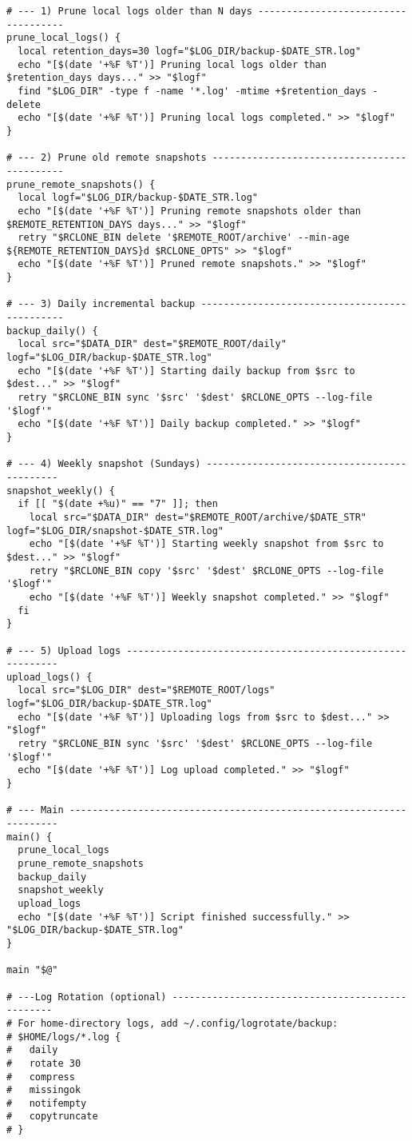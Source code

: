 \documentclass[12pt,letterpaper]{article}
\begin{document}
\begin{lstlisting}[style=custombash]
# --- 1) Prune local logs older than N days ------------------------------------
prune_local_logs() {
  local retention_days=30 logf="$LOG_DIR/backup-$DATE_STR.log"
  echo "[$(date '+%F %T')] Pruning local logs older than $retention_days days..." >> "$logf"
  find "$LOG_DIR" -type f -name '*.log' -mtime +$retention_days -delete
  echo "[$(date '+%F %T')] Pruning local logs completed." >> "$logf"
}

# --- 2) Prune old remote snapshots --------------------------------------------
prune_remote_snapshots() {
  local logf="$LOG_DIR/backup-$DATE_STR.log"
  echo "[$(date '+%F %T')] Pruning remote snapshots older than $REMOTE_RETENTION_DAYS days..." >> "$logf"
  retry "$RCLONE_BIN delete '$REMOTE_ROOT/archive' --min-age ${REMOTE_RETENTION_DAYS}d $RCLONE_OPTS" >> "$logf"
  echo "[$(date '+%F %T')] Pruned remote snapshots." >> "$logf"
}

# --- 3) Daily incremental backup ----------------------------------------------
backup_daily() {
  local src="$DATA_DIR" dest="$REMOTE_ROOT/daily" logf="$LOG_DIR/backup-$DATE_STR.log"
  echo "[$(date '+%F %T')] Starting daily backup from $src to $dest..." >> "$logf"
  retry "$RCLONE_BIN sync '$src' '$dest' $RCLONE_OPTS --log-file '$logf'"
  echo "[$(date '+%F %T')] Daily backup completed." >> "$logf"
}

# --- 4) Weekly snapshot (Sundays) --------------------------------------------
snapshot_weekly() {
  if [[ "$(date +%u)" == "7" ]]; then
    local src="$DATA_DIR" dest="$REMOTE_ROOT/archive/$DATE_STR" logf="$LOG_DIR/snapshot-$DATE_STR.log"
    echo "[$(date '+%F %T')] Starting weekly snapshot from $src to $dest..." >> "$logf"
    retry "$RCLONE_BIN copy '$src' '$dest' $RCLONE_OPTS --log-file '$logf'"
    echo "[$(date '+%F %T')] Weekly snapshot completed." >> "$logf"
  fi
}

# --- 5) Upload logs ----------------------------------------------------------
upload_logs() {
  local src="$LOG_DIR" dest="$REMOTE_ROOT/logs" logf="$LOG_DIR/backup-$DATE_STR.log"
  echo "[$(date '+%F %T')] Uploading logs from $src to $dest..." >> "$logf"
  retry "$RCLONE_BIN sync '$src' '$dest' $RCLONE_OPTS --log-file '$logf'"
  echo "[$(date '+%F %T')] Log upload completed." >> "$logf"
}

# --- Main --------------------------------------------------------------------
main() {
  prune_local_logs
  prune_remote_snapshots
  backup_daily
  snapshot_weekly
  upload_logs
  echo "[$(date '+%F %T')] Script finished successfully." >> "$LOG_DIR/backup-$DATE_STR.log"
}

main "$@"

# ---Log Rotation (optional) -------------------------------------------------
# For home-directory logs, add ~/.config/logrotate/backup:
# $HOME/logs/*.log {
#   daily
#   rotate 30
#   compress
#   missingok
#   notifempty
#   copytruncate
# }
\end{lstlisting}
\end{document}
